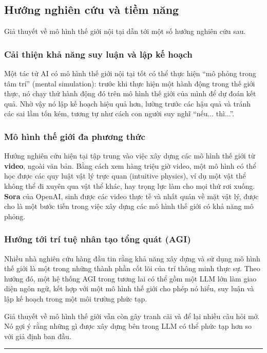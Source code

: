 \subsection{Hướng nghiên cứu và tiềm năng}
\label{ssec:world_models_future}
Giả thuyết về mô hình thế giới nội tại dẫn tới một số hướng nghiên cứu sau.

\subsubsection{Cải thiện khả năng suy luận và lập kế hoạch}
Một tác tử AI có mô hình thế giới nội tại tốt có thể thực hiện “mô phỏng trong tâm trí” (mental simulation): trước khi thực hiện một hành động trong thế giới thực, nó chạy thử hành động đó trên mô hình thế giới của mình để dự đoán kết quả. Nhờ vậy nó lập kế hoạch hiệu quả hơn, lường trước các hậu quả và tránh các sai lầm tốn kém, tương tự như cách con người suy nghĩ “nếu... thì...”.

\subsubsection{Mô hình thế giới đa phương thức}
Hướng nghiên cứu hiện tại tập trung vào việc xây dựng các mô hình thế giới từ \textbf{video}, ngoài văn bản. Bằng cách xem hàng triệu giờ video, một mô hình có thể học được các quy luật vật lý trực quan (intuitive physics), ví dụ một vật thể không thể đi xuyên qua vật thể khác, hay trọng lực làm cho mọi thứ rơi xuống. \textbf{Sora} của OpenAI, sinh được các video thực tế và nhất quán về mặt vật lý, được cho là một bước tiến trong việc xây dựng các mô hình thế giới có khả năng mô phỏng.

\subsubsection{Hướng tới trí tuệ nhân tạo tổng quát (AGI)}
Nhiều nhà nghiên cứu hàng đầu tin rằng khả năng xây dựng và sử dụng mô hình thế giới là một trong những thành phần cốt lõi của trí thông minh thực sự. Theo hướng đó, một hệ thống AGI trong tương lai có thể gồm một LLM lớn làm giao diện ngôn ngữ, kết hợp với một mô hình thế giới cho phép nó hiểu, suy luận và lập kế hoạch trong một môi trường phức tạp.

Giả thuyết về mô hình thế giới vẫn còn gây tranh cãi và để lại nhiều câu hỏi mở. Nó gợi ý rằng những gì được xây dựng bên trong LLM có thể phức tạp hơn so với giả định ban đầu.


\bigskip
\hrule
\bigskip

